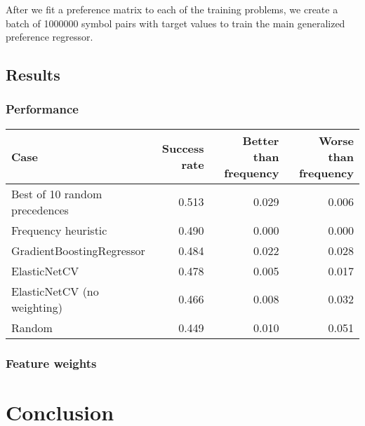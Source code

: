 After we fit a preference matrix to each of the training problems,
we create a batch of 1000000 symbol pairs with target values
to train the main generalized preference regressor.


\subsection{Results}

\subsubsection{Performance}

\begin{tabular}{lrrr}
	Case & Success rate & Better than frequency & Worse than frequency \\
	\hline
	Best of 10 random precedences & 0.513 & 0.029 & 0.006 \\
	Frequency heuristic & 0.490 & 0.000 & 0.000 \\
	GradientBoostingRegressor & 0.484 & 0.022 & 0.028 \\
	ElasticNetCV & 0.478 & 0.005 & 0.017 \\
	ElasticNetCV (no weighting) & 0.466 & 0.008 & 0.032 \\
	Random & 0.449 & 0.010 & 0.051 \\
\end{tabular}


\subsubsection{Feature weights}


\section{Conclusion}


\glsaddall
\printglossaries






